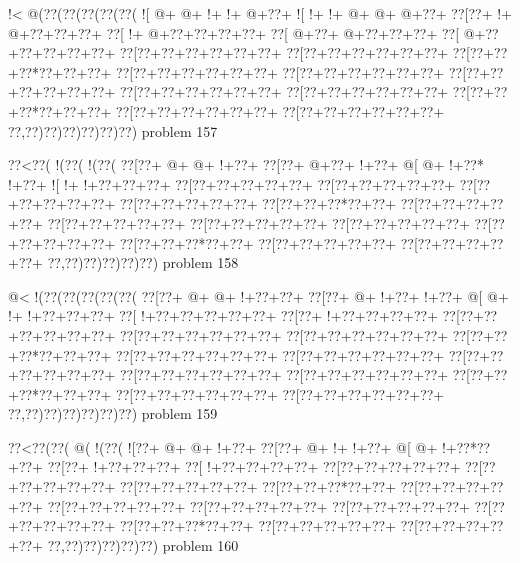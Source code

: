 \vbox{\vbox{\goo
\- !<\- @(\0??(\0??(\0??(\0??(\0??(
\- ![\- @+\- @+\- !+\- !+\- @+\0??+
\- ![\- !+\- !+\- @+\- @+\- @+\0??+
\0??[\0??+\- !+\- @+\0??+\0??+\0??+
\0??[\- !+\- @+\0??+\0??+\0??+\0??+
\0??[\- @+\0??+\- @+\0??+\0??+\0??+
\0??[\- @+\0??+\0??+\0??+\0??+\0??+
\0??[\0??+\0??+\0??+\0??+\0??+\0??+
\0??[\0??+\0??+\0??+\0??+\0??+\0??+
\0??[\0??+\0??+\0??*\0??+\0??+\0??+
\0??[\0??+\0??+\0??+\0??+\0??+\0??+
\0??[\0??+\0??+\0??+\0??+\0??+\0??+
\0??[\0??+\0??+\0??+\0??+\0??+\0??+
\0??[\0??+\0??+\0??+\0??+\0??+\0??+
\0??[\0??+\0??+\0??+\0??+\0??+\0??+
\0??[\0??+\0??+\0??*\0??+\0??+\0??+
\0??[\0??+\0??+\0??+\0??+\0??+\0??+
\0??[\0??+\0??+\0??+\0??+\0??+\0??+
\0??,\0??)\0??)\0??)\0??)\0??)\0??)
}
\hfil problem 157\hfil\break
}

\vbox{\vbox{\goo
\0??<\0??(\- !(\0??(\- !(\0??(
\0??[\0??+\- @+\- @+\- !+\0??+
\0??[\0??+\- @+\0??+\- !+\0??+
\- @[\- @+\- !+\0??*\- !+\0??+
\- ![\- !+\- !+\0??+\0??+\0??+
\0??[\0??+\0??+\0??+\0??+\0??+
\0??[\0??+\0??+\0??+\0??+\0??+
\0??[\0??+\0??+\0??+\0??+\0??+
\0??[\0??+\0??+\0??+\0??+\0??+
\0??[\0??+\0??+\0??*\0??+\0??+
\0??[\0??+\0??+\0??+\0??+\0??+
\0??[\0??+\0??+\0??+\0??+\0??+
\0??[\0??+\0??+\0??+\0??+\0??+
\0??[\0??+\0??+\0??+\0??+\0??+
\0??[\0??+\0??+\0??+\0??+\0??+
\0??[\0??+\0??+\0??*\0??+\0??+
\0??[\0??+\0??+\0??+\0??+\0??+
\0??[\0??+\0??+\0??+\0??+\0??+
\0??,\0??)\0??)\0??)\0??)\0??)
}
\hfil problem 158\hfil\break
}

\vbox{\vbox{\goo
\- @<\- !(\0??(\0??(\0??(\0??(\0??(
\0??[\0??+\- @+\- @+\- !+\0??+\0??+
\0??[\0??+\- @+\- !+\0??+\- !+\0??+
\- @[\- @+\- !+\- !+\0??+\0??+\0??+
\0??[\- !+\0??+\0??+\0??+\0??+\0??+
\0??[\0??+\- !+\0??+\0??+\0??+\0??+
\0??[\0??+\0??+\0??+\0??+\0??+\0??+
\0??[\0??+\0??+\0??+\0??+\0??+\0??+
\0??[\0??+\0??+\0??+\0??+\0??+\0??+
\0??[\0??+\0??+\0??*\0??+\0??+\0??+
\0??[\0??+\0??+\0??+\0??+\0??+\0??+
\0??[\0??+\0??+\0??+\0??+\0??+\0??+
\0??[\0??+\0??+\0??+\0??+\0??+\0??+
\0??[\0??+\0??+\0??+\0??+\0??+\0??+
\0??[\0??+\0??+\0??+\0??+\0??+\0??+
\0??[\0??+\0??+\0??*\0??+\0??+\0??+
\0??[\0??+\0??+\0??+\0??+\0??+\0??+
\0??[\0??+\0??+\0??+\0??+\0??+\0??+
\0??,\0??)\0??)\0??)\0??)\0??)\0??)
}
\hfil problem 159\hfil\break
}

\vbox{\vbox{\goo
\0??<\0??(\0??(\- @(\- !(\0??(
\- ![\0??+\- @+\- @+\- !+\0??+
\0??[\0??+\- @+\- !+\- !+\0??+
\- @[\- @+\- !+\0??*\0??+\0??+
\0??[\0??+\- !+\0??+\0??+\0??+
\0??[\- !+\0??+\0??+\0??+\0??+
\0??[\0??+\0??+\0??+\0??+\0??+
\0??[\0??+\0??+\0??+\0??+\0??+
\0??[\0??+\0??+\0??+\0??+\0??+
\0??[\0??+\0??+\0??*\0??+\0??+
\0??[\0??+\0??+\0??+\0??+\0??+
\0??[\0??+\0??+\0??+\0??+\0??+
\0??[\0??+\0??+\0??+\0??+\0??+
\0??[\0??+\0??+\0??+\0??+\0??+
\0??[\0??+\0??+\0??+\0??+\0??+
\0??[\0??+\0??+\0??*\0??+\0??+
\0??[\0??+\0??+\0??+\0??+\0??+
\0??[\0??+\0??+\0??+\0??+\0??+
\0??,\0??)\0??)\0??)\0??)\0??)
}
\hfil problem 160\hfil\break
}

